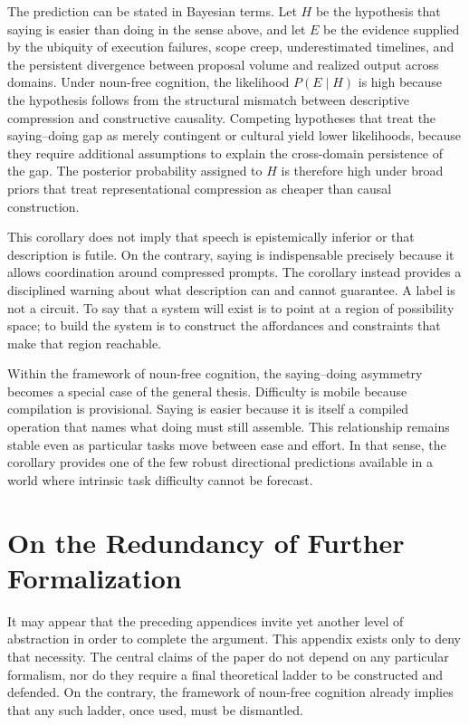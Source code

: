 \documentclass[12pt]{article}
\begin{document}
The prediction can be stated in Bayesian terms. Let $H$ be the hypothesis that saying is easier than doing in the sense above, and let $E$ be the evidence supplied by the ubiquity of execution failures, scope creep, underestimated timelines, and the persistent divergence between proposal volume and realized output across domains. Under noun-free cognition, the likelihood $P(E\mid H)$ is high because the hypothesis follows from the structural mismatch between descriptive compression and constructive causality. Competing hypotheses that treat the saying--doing gap as merely contingent or cultural yield lower likelihoods, because they require additional assumptions to explain the cross-domain persistence of the gap. The posterior probability assigned to $H$ is therefore high under broad priors that treat representational compression as cheaper than causal construction.

This corollary does not imply that speech is epistemically inferior or that description is futile. On the contrary, saying is indispensable precisely because it allows coordination around compressed prompts. The corollary instead provides a disciplined warning about what description can and cannot guarantee. A label is not a circuit. To say that a system will exist is to point at a region of possibility space; to build the system is to construct the affordances and constraints that make that region reachable.

Within the framework of noun-free cognition, the saying--doing asymmetry becomes a special case of the general thesis. Difficulty is mobile because compilation is provisional. Saying is easier because it is itself a compiled operation that names what doing must still assemble. This relationship remains stable even as particular tasks move between ease and effort. In that sense, the corollary provides one of the few robust directional predictions available in a world where intrinsic task difficulty cannot be forecast.

\section{On the Redundancy of Further Formalization}

It may appear that the preceding appendices invite yet another level of abstraction in order to complete the argument. This appendix exists only to deny that necessity. The central claims of the paper do not depend on any particular formalism, nor do they require a final theoretical ladder to be constructed and defended. On the contrary, the framework of noun-free cognition already implies that any such ladder, once used, must be dismantled.
\end{document}
